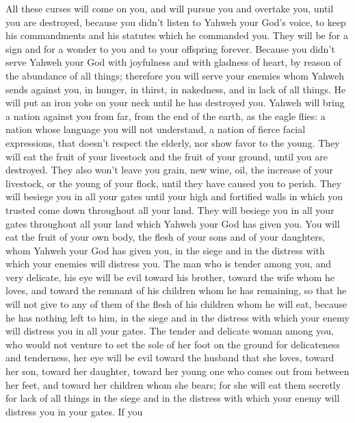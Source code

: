  All these curses will come on you, and will pursue you and
overtake you, until you are destroyed, because you didn't listen to
Yahweh your God's voice, to keep his commandments and his statutes which
he commanded you.  They will be for a sign and for a wonder
to you and to your offspring forever.  Because you didn't
serve Yahweh your God with joyfulness and with gladness of heart, by
reason of the abundance of all things;  therefore you will
serve your enemies whom Yahweh sends against you, in hunger, in thirst,
in nakedness, and in lack of all things. He will put an iron yoke on
your neck until he has destroyed you.  Yahweh will bring a
nation against you from far, from the end of the earth, as the eagle
flies: a nation whose language you will not understand,  a
nation of fierce facial expressions, that doesn't respect the elderly,
nor show favor to the young.  They will eat the fruit of
your livestock and the fruit of your ground, until you are destroyed.
They also won't leave you grain, new wine, oil, the increase of your
livestock, or the young of your flock, until they have caused you to
perish.  They will besiege you in all your gates until your
high and fortified walls in which you trusted come down throughout all
your land. They will besiege you in all your gates throughout all your
land which Yahweh your God has given you.  You will eat the
fruit of your own body, the flesh of your sons and of your daughters,
whom Yahweh your God has given you, in the siege and in the distress
with which your enemies will distress you.  The man who is
tender among you, and very delicate, his eye will be evil toward his
brother, toward the wife whom he loves, and toward the remnant of his
children whom he has remaining,  so that he will not give
to any of them of the flesh of his children whom he will eat, because he
has nothing left to him, in the siege and in the distress with which
your enemy will distress you in all your gates.  The tender
and delicate woman among you, who would not venture to set the sole of
her foot on the ground for delicateness and tenderness, her eye will be
evil toward the husband that she loves, toward her son, toward her
daughter,  toward her young one who comes out from between
her feet, and toward her children whom she bears; for she will eat them
secretly for lack of all things in the siege and in the distress with
which your enemy will distress you in your gates.  If you
